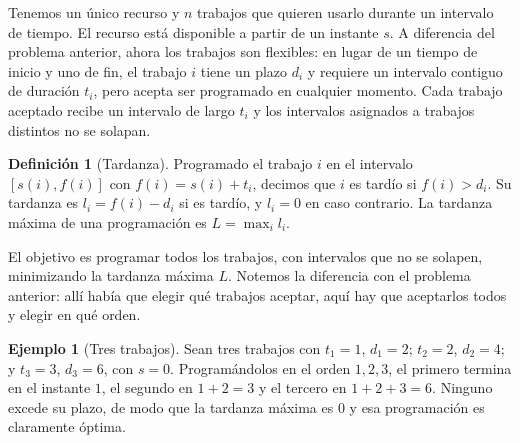\documentclass[12pt, spanish, oneside, openany]{book}
\theoremstyle{uprightplain}
\theoremstyle{definition}
\newtheorem{definicion}[teorema]{Definición}
\newtheorem{ejemplo}[teorema]{Ejemplo}
\theoremstyle{remark}
\theoremstyle{definition}
\begin{document}
Tenemos un único recurso y $n$ trabajos que quieren usarlo durante un intervalo de tiempo. El recurso está disponible a partir de un instante $s$. A diferencia del problema anterior, ahora los trabajos son flexibles: en lugar de un tiempo de inicio y uno de fin, el trabajo $i$ tiene un plazo $d_i$ y requiere un intervalo contiguo de duración $t_i$, pero acepta ser programado en cualquier momento. Cada trabajo aceptado recibe un intervalo de largo $t_i$ y los intervalos asignados a trabajos distintos no se solapan.

\begin{definicion}[Tardanza]
\label{def:retraso}
Programado el trabajo $i$ en el intervalo $[s(i),f(i)]$ con $f(i)=s(i)+t_i$, decimos que $i$ es tardío si $f(i)>d_i$. Su tardanza es $l_i=f(i)-d_i$ si es tardío, y $l_i=0$ en caso contrario. La tardanza máxima de una programación es $L=\max_i l_i$.
\end{definicion}

El objetivo es programar todos los trabajos, con intervalos que no se solapen, minimizando la tardanza máxima $L$. Notemos la diferencia con el problema anterior: allí había que elegir qué trabajos aceptar, aquí hay que aceptarlos todos y elegir en qué orden.

\begin{ejemplo}[Tres trabajos]
\label{ej:tres-trabajos}
Sean tres trabajos con $t_1=1$, $d_1=2$; $t_2=2$, $d_2=4$; y $t_3=3$, $d_3=6$, con $s=0$. Programándolos en el orden $1,2,3$, el primero termina en el instante $1$, el segundo en $1+2=3$ y el tercero en $1+2+3=6$. Ninguno excede su plazo, de modo que la tardanza máxima es $0$ y esa programación es claramente óptima.
\end{ejemplo}
\end{document}
